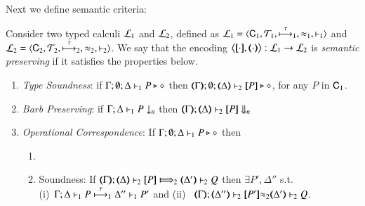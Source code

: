 \documentclass[runningheads]{llncs}
\begin{document}
{Next we define semantic criteria: %


\begin{definition}%
\label{def:ep}
       Consider two typed calculi $\tyl{L}_1$ and  $\tyl{L}_2$, defined as 
        $\tyl{L}_1=\calc{\CAL_1}{{\cal{T}}_1}{\hby{\tau}_1}{\wb_1}{\proves_1}$
       and $\tyl{L}_2=\calc{\CAL_2}{{\cal{T}}_2}{\hby{\tau}_2}{\wb_2}{\proves_2}$.
We say that the encoding $\enco{\map{\cdot}, \mapt{\cdot}}: \tyl{L}_1 \to \tyl{L}_2$ is   \emph{semantic preserving}
if it satisfies the properties below.
	
	\begin{enumerate}[1.]
		\item \emph{Type Soundness}:
	if
	$\Gamma; \emptyset; \Delta \proves_1 P \hastype \Proc$ then 
	$\mapt{\Gamma}; \emptyset; \mapt{\Delta} \proves_2 \map{P} \hastype \Proc$,  
	for any   $P$ in $\CAL_1$.

			\item \emph{Barb Preserving}: if $\Gamma; \Delta \proves_1 P \barb{n}$
		then $\mapt{\Gamma}; \mapt{\Delta} \proves_2 \map{P} \Barb{n}$

	\item \emph{Operational Correspondence}: If $\Gamma; \emptyset; \Delta \proves_1 P \hastype \Proc$ then
		\begin{enumerate}
			\item	{}
				
			\item	Soundness:   
				If  $\wtytraargi{\mapt{\Gamma}}{}{\mapt{\Delta}}{\map{P}}{\mapt{\Delta'}}{Q}{2}{2}$
				then  $\exists P', \Delta''$ s.t.  \\
				(i)~$\stytraargi{\Gamma}{\tau}{\Delta}{P}{\Delta''}{P'}{1}{1}$
				and 
				(ii)~
${\mapt{\Gamma}};{\mapt{\Delta''}}\proves_2 {\map{P'}}{\wb_2}
{\mapt{\Delta'}}\proves_2 {Q}$.


\end{enumerate}
\end{enumerate}
\end{definition}}
\end{document}
